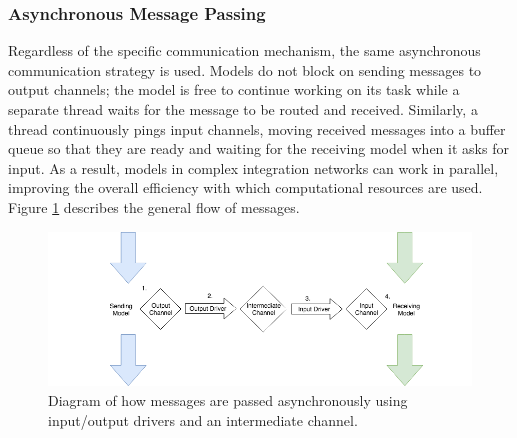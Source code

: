 \documentclass[journal]{IEEEtran}
\begin{document}
\subsubsection{Asynchronous Message Passing}\label{SSS:async}
%
Regardless of the specific communication mechanism, the same asynchronous
communication strategy is used. Models do not block on sending messages to 
output channels; the model is free to continue working on its task while 
a separate thread waits for the message to be routed and received. Similarly, 
a thread continuously pings input channels, moving received messages into a 
buffer queue so that they are ready and waiting for the receiving model 
when it asks for input. As a result, models in complex integration networks 
can work in parallel, improving the overall efficiency with which computational 
resources are used. Figure \ref{fig:async} describes the general flow of messages.
%
\ifinclfig
 	\begin{figure}[htbp]
	\begin{center}
	\includegraphics[width=\columnwidth,keepaspectratio]{./images/io_drivers.png}
	\caption{Diagram of how messages are passed asynchronously using input/output drivers and an intermediate channel.}
	\label{fig:async}
	\end{center}
	\end{figure}
\fi
%
\end{document}
